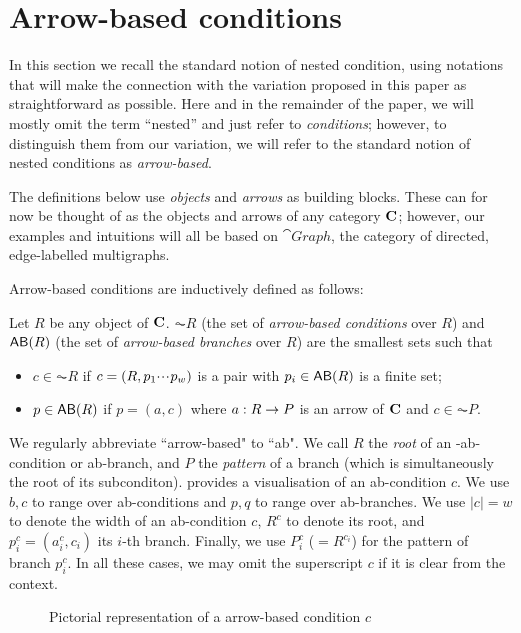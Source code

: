 \section{Arrow-based conditions}

In this section we recall the standard notion of nested condition, using notations that will make the connection with the variation proposed in this paper as straightforward as possible. Here and in the remainder of the paper, we will mostly omit the term ``nested'' and just refer to \emph{conditions}; however, to distinguish them from our variation, we will refer to the standard notion of nested conditions as \emph{arrow-based}.

The definitions below use \emph{objects} and \emph{arrows} as building blocks. These can for now be thought of as the objects and arrows of any category $\mathbf{C}$; however, our examples and intuitions will all be based on $\cat{Graph}$, the category of directed, edge-labelled multigraphs. 

Arrow-based conditions are inductively defined as follows:

\begin{definition}
  Let $R$ be any object of $\mathbf{C}$. $\AC R$ (the set of \emph{arrow-based conditions} over $R$) and $\AB R$ (the set of \emph{arrow-based branches} over $R$) are the smallest sets such that
  \begin{itemize}
  \item $c\in \AC R$ if $c=(R,p_1{\cdotp\mkern-2mu\cdotp\mkern-2mu\cdotp\mkern1mu} p_w)$ is a pair with $p_i\in \AB R$ is a finite set;
  \item $p\in \AB R$ if $p=(a,c)$ where $a: R\rightarrow P$ is an arrow of $\mathbf{C}$ and $c\in \AC P$.
  \end{itemize}
\end{definition}
%
We regularly abbreviate ``arrow-based" to ``ab". We call $R$ the \emph{root} of an -ab-condition or ab-branch, and $P$ the \emph{pattern} of a branch (which is simultaneously the root of its subconditon).  provides a visualisation of an ab-condition $c$. We use $b,c$ to range over ab-conditions and $p,q$ to range over ab-branches. We use $|c|=w$ to denote the width of an ab-condition $c$, $R^c$ to denote its root, and $p^c_i=(a^c_i,c_i)$ its $i$-th branch. Finally, we use $P^c_i$ ($=R^{c_i}$) for the pattern of branch $p^c_i$. In all these cases, we may omit the superscript $c$ if it is clear from the context.
%
\begin{figure}
  \centering
  
  \caption{Pictorial representation of a arrow-based condition $c$}
\end{figure}

